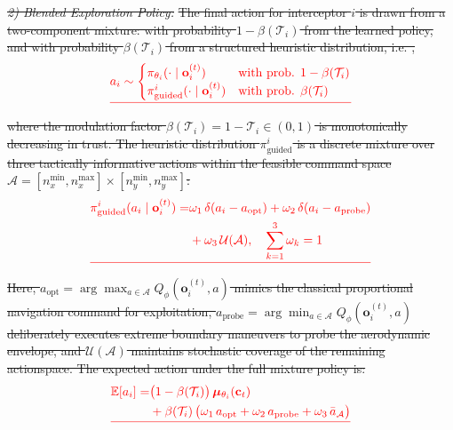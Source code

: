 \documentclass[lettersize,journal]{IEEEtran}
\providecommand{\DIFdel}[1]{{\protect\color{red}\sout{#1}}}                      %
\providecommand{\DIFdelbegin}{} %
\newcommand{\DIFscaledelfig}{0.5}
\newlength{\DIFdelgraphicswidth} %
\newlength{\DIFdelgraphicsheight} %
\newcommand{\DIFdelincludegraphics}[2][]{%
\sbox{\DIFdelgraphicsbox}{\DIFOincludegraphics[#1]{#2}}%
\settoboxwidth{\DIFdelgraphicswidth}{\DIFdelgraphicsbox} %
\settoboxtotalheight{\DIFdelgraphicsheight}{\DIFdelgraphicsbox} %
\scalebox{\DIFscaledelfig}{%
\parbox[b]{\DIFdelgraphicswidth}{\usebox{\DIFdelgraphicsbox}\\[-\baselineskip] \rule{\DIFdelgraphicswidth}{0em}}\llap{\resizebox{\DIFdelgraphicswidth}{\DIFdelgraphicsheight}{%
\setlength{\unitlength}{\DIFdelgraphicswidth}%
\begin{picture}(1,1)%
\thicklines\linethickness{2pt} %
{\color[rgb]{1,0,0}\put(0,0){\framebox(1,1){}}}%
{\color[rgb]{1,0,0}\put(0,0){\line( 1,1){1}}}%
{\color[rgb]{1,0,0}\put(0,1){\line(1,-1){1}}}%
\end{picture}%
}\hspace*{3pt}}} %
} %
\DeclareRobustCommand{\DIFdelbegin}{\DIFOdelbegin \let\includegraphics\DIFdelincludegraphics} %
\begin{document}
\DIFdelbegin \emph{\DIFdel{2) Blended Exploration Policy:}} %
\DIFdel{The final action for interceptor $i$ is drawn from a two-component mixture: with probability $1-\beta(\mathcal{T}_i)$ from the
learned policy, and with probability $\beta(\mathcal{T}_i)$ from a structured heuristic distribution, i.e.
,
}\begin{displaymath}
\DIFdel{
a_i \sim \begin{cases} \pi_{\theta_i}(\cdot \mid \mathbf{o}_i^{(t)}) & \text{with prob. } 1 - \beta(\mathcal{T}_i) \\ \pi_{\mathrm{guided}}^{i}(\cdot \mid \mathbf{o}_i^{(t)}) & \text{with prob. } \beta(\mathcal{T}_i) \end{cases}
}\end{displaymath}%
\DIFdel{where the modulation factor $\beta(\mathcal{T}_i) = 1 - \mathcal{T}_i \in (0,1)$ is monotonically decreasing in trust. The heuristic distribution $\pi_{\mathrm{guided}}^{i}$ is a discrete mixture
over three tactically informative actions within the feasible command space $\mathcal{A} = [n_{x}^{\min}, n_{x}^{\max}] \times [n_{y}^{\min}, n_{y}^{\max}]$:
}\begin{displaymath}
\DIFdel{%
\begin{split}
\pi_{\mathrm{guided}}^{i}(a_i \mid \mathbf{o}_i^{(t)}) =& \omega_1\,\delta(a_i - a_{\mathrm{opt}}) + \omega_2\,\delta(a_i - a_{\mathrm{probe}}) \\
&+ \omega_3\,\mathcal{U}(\mathcal{A}), \quad \sum_{k=1}^3\omega_k=1
\end{split}
}\end{displaymath}%
\DIFdel{Here, $a_{\mathrm{opt}} = \arg\max_{a \in \mathcal{A}} Q_\phi(\mathbf{o}_i^{(t)}, a)$ mimics the classical proportional navigation command for exploitation, $a_{\mathrm{probe}} = \arg\min_{a \in \mathcal{A}} Q_\phi(\mathbf{o}_i^{(t)}, a)$ deliberately executes extreme boundary maneuvers to probe the
aerodynamic envelope, and $\mathcal{U}(\mathcal{A})$ maintains stochastic coverage of the remaining actionspace. The expected action under the full mixture policy is:
}\begin{displaymath}
\DIFdel{
\begin{split}
\mathbb{E}[a_i] =& \bigl(1-\beta(\mathcal{T}_i)\bigr)\,\boldsymbol{\mu}_{\theta_i}(\mathbf{c}_t) \\
&+ \beta(\mathcal{T}_i)\,\bigl(\omega_1\,a_{\mathrm{opt}} + \omega_2\,a_{\mathrm{probe}} + \omega_3\,\bar{a}_{\mathcal{A}}\bigr)
\end{split}
}\end{displaymath}%
\end{document}
